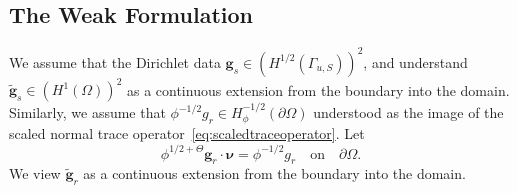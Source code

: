 \subsection{The Weak Formulation}
We assume that the Dirichlet data
$\mathbf{g}_s \in (H^{1/2}(\Gamma_{u,S}))^2$, and understand 
$\tilde{\mathbf{g}}_s \in (H^1(\Omega))^2$ as a continuous extension from the
boundary into the domain.
Similarly, we assume that $\phi^{-1/2} g_r \in H^{-1/2}_\phi(\partial \Omega)$
understood as the image of the scaled normal trace operator~\eqref{eq:scaledtraceoperator}.
Let
\begin{equation}
		  \phi^{1/2+\Theta}\mathbf{g}_r\cdot \pmb{\nu} = \phi^{-1/2}g_r \quad \text{on} \quad \partial \Omega.
\end{equation}
We view $\tilde{\mathbf{g}}_r$ as a continuous extension from the boundary into the domain.


